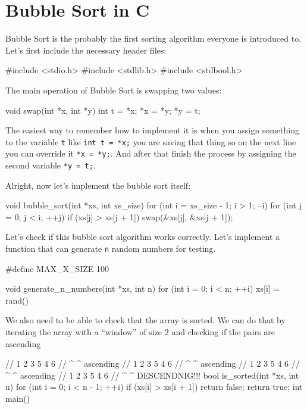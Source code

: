 ﻿\documentclass{article}
\newenvironment{code}{\footnotesize\verbatim}{\endverbatim\normalsize}
\begin{document}
\section{Bubble Sort in C}

Bubble Sort is the probably the first sorting algorithm everyone is introduced to. Let's first include the necessary header files:

\begin{code}
#include <stdio.h>
#include <stdlib.h>
#include <stdbool.h>
\end{code}

The main operation of Bubble Sort is swapping two values:

\begin{code}
void swap(int *x, int *y)
{
    int t = *x;
    *x = *y;
    *y = t;
}   
\end{code}

The easiest way to remember how to implement it is when you assign something to the variable \verb|t| like \verb|int t = *x;| you are saving that thing so on the next line you can override it \verb|*x = *y;|. And after that finish the process by assigning the second variable \verb|*y = t;|.

Alright, now let's implement the bubble sort itself:

\begin{code}
void bubble_sort(int *xs, int xs_size)
{
   for (int i = xs_size - 1; i > 1; --i) {
       for (int j = 0; j < i; ++j) {
           if (xs[j] > xs[j + 1]) {
               swap(&xs[j], &xs[j + 1]);
           }
       }
   }
}
\end{code}

Let's check if this bubble sort algorithm works correctly. Let's implement a function that can generate \verb|n| random numbers for testing.

\begin{code}
#define MAX_X_SIZE 100

void generate_n_numbers(int *xs, int n)
{
    for (int i = 0; i < n; ++i) {
        xs[i] = rand() %
    }
}
\end{code}

We also need to be able to check that the array is sorted. We can do that by iterating the array with a ``window'' of size 2 and checking if the pairs are ascending

\pagebreak

\begin{code}
// 1 2 3 5 4 6
// ^ ^ ascending
// 1 2 3 5 4 6
//   ^ ^ ascending
// 1 2 3 5 4 6
//     ^ ^ ascending
// 1 2 3 5 4 6
//       ^ ^ DESCENDNIG!!!
bool is_sorted(int *xs, int n)
{
    for (int i = 0; i < n - 1; ++i) {
        if (xs[i] > xs[i + 1]) {
            return false;
        }
    }
    return true;
}
int main(){}
\end{code}
\end{document}
